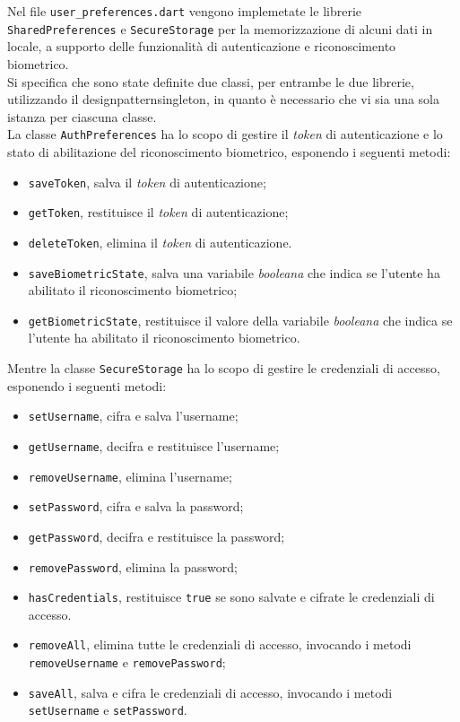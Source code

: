Nel file \lstinline{user_preferences.dart} vengono implemetate le librerie \lstinline{SharedPreferences} \cite{site:shared-preferences} e \lstinline{SecureStorage} \cite{site:flutter-secure-storage} per la memorizzazione di alcuni dati in locale, a supporto delle funzionalità di autenticazione e riconoscimento biometrico. \\
Si specifica che sono state definite due classi, per entrambe le due librerie, utilizzando il \gls{designpattern}\glsoccur \gls{singleton}\glsoccur, in quanto è necessario che vi sia una sola istanza per ciascuna classe. \\
La classe \lstinline{AuthPreferences} ha lo scopo di gestire il \emph{token} di autenticazione e lo stato di abilitazione del riconoscimento biometrico, esponendo i seguenti metodi:
\begin{itemize}
    \item \lstinline{saveToken}, salva il \emph{token} di autenticazione;
    \item \lstinline{getToken}, restituisce il \emph{token} di autenticazione;
    \item \lstinline{deleteToken}, elimina il \emph{token} di autenticazione.
    \item \lstinline{saveBiometricState}, salva una variabile \emph{booleana} che indica se l'utente ha abilitato il riconoscimento biometrico;
    \item \lstinline{getBiometricState}, restituisce il valore della variabile \emph{booleana} che indica se l'utente ha abilitato il riconoscimento biometrico.
\end{itemize}
Mentre la classe \lstinline{SecureStorage} ha lo scopo di gestire le credenziali di accesso, esponendo i seguenti metodi:
\begin{itemize}
    \item \lstinline{setUsername}, cifra e salva l'username;
    \item \lstinline{getUsername}, decifra e restituisce l'username;
    \item \lstinline{removeUsername}, elimina l'username;
    \item \lstinline{setPassword}, cifra e salva la password;
    \item \lstinline{getPassword}, decifra e restituisce la password;
    \item \lstinline{removePassword}, elimina la password;
    \item \lstinline{hasCredentials}, restituisce \lstinline{true} se sono salvate e cifrate le credenziali di accesso.
    \item \lstinline{removeAll}, elimina tutte le credenziali di accesso, invocando i metodi \lstinline{removeUsername} e \lstinline{removePassword};
    \item \lstinline{saveAll}, salva e cifra le credenziali di accesso, invocando i metodi \lstinline{setUsername} e \lstinline{setPassword}.
\end{itemize}

